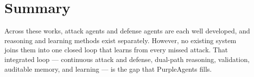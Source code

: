 \section{Summary}

Across these works, attack agents and defense agents are each well developed, and
reasoning and learning methods exist separately. However, no existing system
joins them into one closed loop that learns from every missed attack. That
integrated loop --- continuous attack and defense, dual-path reasoning,
validation, auditable memory, and learning --- is the gap that PurpleAgents
fills.
